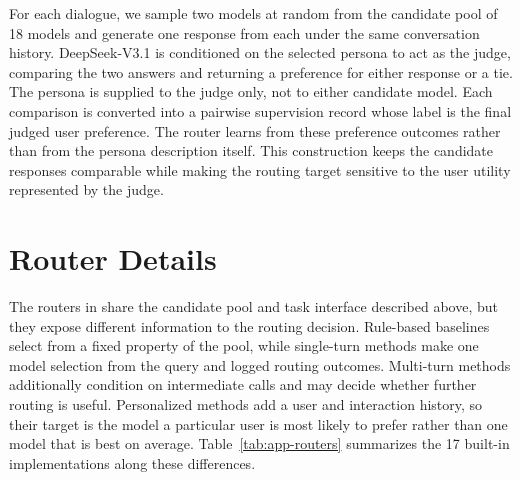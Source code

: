 For each dialogue, we sample two models at random from the candidate pool of 18 models and generate one response from each under the same conversation history. DeepSeek-V3.1 is conditioned on the selected persona to act as the judge, comparing the two answers and returning a preference for either response or a tie. The persona is supplied to the judge only, not to either candidate model. Each comparison is converted into a pairwise supervision record whose label is the final judged user preference. The router learns from these preference outcomes rather than from the persona description itself. This construction keeps the candidate responses comparable while making the routing target sensitive to the user utility represented by the judge.



\section{Router Details} \label{app:routers}

The routers in \method share the candidate pool and task interface described above, but they expose different information to the routing decision. Rule-based baselines select from a fixed property of the pool, while single-turn methods make one model selection from the query and logged routing outcomes. Multi-turn methods additionally condition on intermediate calls and may decide whether further routing is useful. Personalized methods add a user and interaction history, so their target is the model a particular user is most likely to prefer rather than one model that is best on average. Table~\ref{tab:app-routers} summarizes the 17 built-in implementations along these differences.

